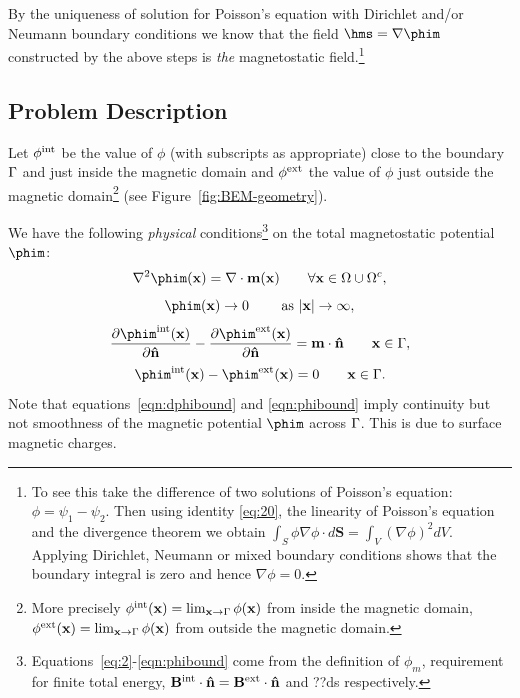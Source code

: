 By the uniqueness of solution for Poisson's equation with Dirichlet and/or Neumann boundary conditions we know that the field $ \hms = \nabla \phim$  constructed by the above steps is \emph{the} magnetostatic field.\footnote{To see this take the difference of two solutions of Poisson's equation: $\phi = \psi_1 - \psi_2$. Then using identity \eqref{eq:20}, the linearity of Poisson's equation and the divergence theorem we obtain $\int_S \phi \nabla \phi \cdot d \mathbf{S} = \int_V (\nabla \phi)^2 dV$. Applying Dirichlet, Neumann or mixed boundary conditions shows that the boundary integral is zero and hence $\nabla \phi = 0$.}

\subsection{Problem Description}
\label{sec:problem-description}
Let $\phi^{\text{int}}$ be the value of $\phi$ (with subscripts as appropriate) close to the boundary ${\Gamma}$ and just inside the magnetic domain  and $\phi^{\text{ext}}$ the value of $\phi$ just outside the magnetic domain\footnote{More precisely $\phi^{\text{int}}(\mathbf{x}) = \lim_{\mathbf{x} \rightarrow {\Gamma}} \phi(\mathbf{x})$ from inside the magnetic domain, $\phi^{\text{ext}}(\mathbf{x}) = \lim_{\mathbf{x} \rightarrow {\Gamma}} \phi(\mathbf{x})$ from outside the magnetic domain.} (see Figure~\ref{fig:BEM-geometry}).

\pagebreak %

We have the following \emph{physical} conditions\footnote{Equations~\eqref{eq:2}-\eqref{eqn:phibound} come from the definition of $\phi_m$, requirement for finite total energy, $\mathbf{B}^\text{int} \cdot \mathbf{\hat{n}} = \mathbf{B}^\text{ext} \cdot \mathbf{\hat{n}}$ and ??ds respectively.} on the total magnetostatic potential $\phim$:
\begin{equation}
  \nabla^2 \phim(\xv) = \nabla \cdot \mv(\xv) \qquad \forall \xv \in \magd \cup \extd,
  \label{eq:2}
\end{equation}
\begin{equation}
  \phim(\xv) \rightarrow 0 \qquad \text{ as } |\xv| \rightarrow \infty,
\end{equation}
\begin{equation}
  \pd{\phim^\inte(\xv)}{\nv} - \pd{\phim^\exte(\xv)}{\nv} = \mv \cdot \nv \qquad \xv \in \boundd,
  \label{eqn:dphibound}
\end{equation}
\begin{equation}
  \phim^\inte(\xv) - \phim^\exte(\xv)  = 0 \qquad \xv \in \boundd.
  \label{eqn:phibound}
\end{equation}
Note that equations~\eqref{eqn:dphibound} and \eqref{eqn:phibound} imply continuity but not smoothness of the magnetic potential $\phim$ across ${\Gamma}$. This is due to surface magnetic charges.

